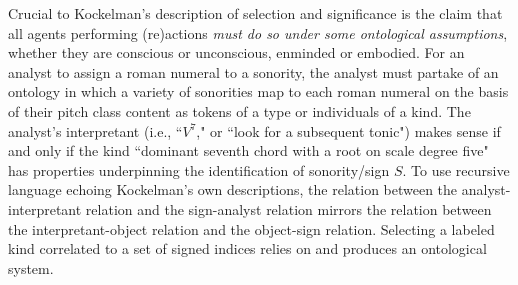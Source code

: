 Crucial to Kockelman's description of selection and significance is the claim that all agents performing (re)actions \emph{must do so under some ontological assumptions}, whether they are conscious or unconscious, enminded or embodied.  For an analyst to assign a roman numeral to a sonority, the analyst must partake of an ontology in which a variety of sonorities map to each roman numeral on the basis of their pitch class content as tokens of a type or individuals of a kind.  The analyst's interpretant (i.e., ``$V^7$," or ``look for a subsequent tonic") makes sense if and only if the kind ``dominant seventh chord with a root on scale degree five" has properties underpinning the identification of sonority/sign $S$. To use recursive language echoing Kockelman's own descriptions, the relation between the analyst-interpretant relation and the sign-analyst relation mirrors the relation between the interpretant-object relation and the object-sign relation.  Selecting a labeled kind correlated to a set of signed indices relies on and produces an ontological system.  

